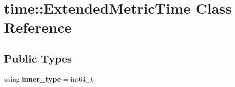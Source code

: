 \hypertarget{classtime_1_1_extended_metric_time}{}\section{time\+::Extended\+Metric\+Time Class Reference}
\label{classtime_1_1_extended_metric_time}
\subsection*{Public Types}
\begin{DoxyCompactItemize}
\item 
\mbox{\label{classtime_1_1_extended_metric_time_a7a48f83c0f0cd1ebac445c0f3fcc19bc}} 
using {\bfseries inner\+\_\+type} = int64\+\_\+t
\end{DoxyCompactItemize}
